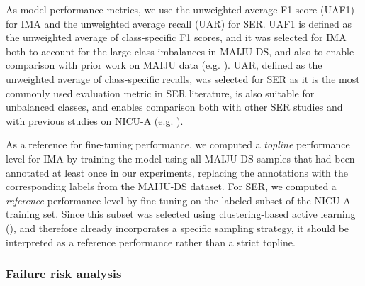 \documentclass[a4paper,fleqn]{cas-dc}
\begin{document}
As model performance metrics, we use the unweighted average F1 score (UAF1) for IMA and the unweighted average recall (UAR) for SER. UAF1 is defined as the unweighted average of class-specific F1 scores, and it was selected for IMA both to account for the large class imbalances in MAIJU-DS, and also to enable comparison with prior work on MAIJU data (e.g. \cite{maiju_commsmed, iar_2_0, pfml}). UAR, defined as the unweighted average of class-specific recalls, was selected for SER as it is the most commonly used evaluation metric in SER literature, is also suitable for unbalanced classes, and enables comparison both with other SER studies and with previous studies on NICU-A (e.g. \cite{nicu_a_speechcomm, iar_2_0, pfml}).

As a reference for fine-tuning performance, we computed a \textit{topline} performance level for IMA by training the model using all MAIJU-DS samples that had been annotated at least once in our experiments, replacing the annotations with the corresponding labels from the MAIJU-DS dataset. For SER, we computed a \textit{reference} performance level by fine-tuning on the labeled subset of the NICU-A training set. Since this subset was selected using clustering-based active learning (\cite{nicu_a_speechcomm}), and therefore already incorporates a specific sampling strategy, it should be interpreted as a reference performance rather than a strict topline.


\subsubsection{Failure risk analysis} \label{subsubsec_failure_risk_analysis}
\end{document}
